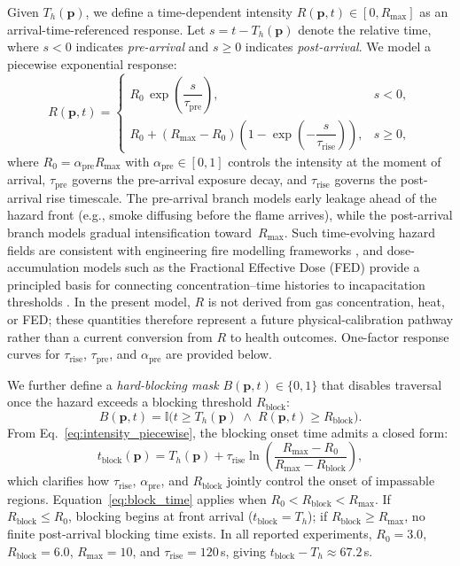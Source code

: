 \documentclass[preprint,12pt]{elsarticle}
\begin{document}
Given $T_h(\mathbf{p})$, we define a time-dependent intensity
$R(\mathbf{p}, t) \in [0, R_{\max}]$ as an arrival-time-referenced response.
Let $s = t - T_h(\mathbf{p})$ denote the relative time, where $s < 0$ indicates
\emph{pre-arrival} and $s \geq 0$ indicates \emph{post-arrival}. We model a
piecewise exponential response:
\begin{equation}
R(\mathbf{p}, t) =
\begin{cases}
R_0 \,\exp\!\left(\dfrac{s}{\tau_{\mathrm{pre}}}\right),
& s < 0, \\[8pt]
R_0 + (R_{\max} - R_0)\!\left(1 - \exp\!\left(-\dfrac{s}{\tau_{\mathrm{rise}}}\right)\right),
& s \geq 0,
\end{cases}
\label{eq:intensity_piecewise}
\end{equation}
where $R_0 = \alpha_{\mathrm{pre}} R_{\max}$ with $\alpha_{\mathrm{pre}} \in [0,1]$
controls the intensity at the moment of arrival, $\tau_{\mathrm{pre}}$ governs the
pre-arrival exposure decay, and $\tau_{\mathrm{rise}}$ governs the post-arrival
rise timescale. The pre-arrival branch models early leakage ahead of the hazard
front (e.g., smoke diffusing before the flame arrives), while the post-arrival
branch models gradual intensification toward~$R_{\max}$.
Such time-evolving hazard fields are consistent with engineering fire modelling
frameworks \citep{McGrattan2013FDS}, and dose-accumulation models such as the
Fractional Effective Dose (FED) provide a principled basis for connecting
concentration--time histories to incapacitation thresholds \citep{Purser1989FED}.
In the present model, $R$ is not derived from gas concentration, heat, or
FED; these quantities therefore represent a future physical-calibration
pathway rather than a current conversion from $R$ to health outcomes.
One-factor response curves for $\tau_{\mathrm{rise}}$,
$\tau_{\mathrm{pre}}$, and $\alpha_{\mathrm{pre}}$ are provided below.

We further define a \emph{hard-blocking mask} $B(\mathbf{p}, t) \in \{0, 1\}$
that disables traversal once the hazard exceeds a blocking threshold
$R_{\mathrm{block}}$:
\begin{equation}
B(\mathbf{p}, t)
= \mathbb{I}\!\Big(
t \geq T_h(\mathbf{p}) \;\wedge\; R(\mathbf{p}, t) \geq R_{\mathrm{block}}
\Big).
\label{eq:blocking}
\end{equation}
From Eq.~\eqref{eq:intensity_piecewise}, the blocking onset time admits a closed
form:
\begin{equation}
t_{\mathrm{block}}(\mathbf{p})
= T_h(\mathbf{p}) + \tau_{\mathrm{rise}} \ln\!\left(
\frac{R_{\max} - R_0}{R_{\max} - R_{\mathrm{block}}}
\right),
\label{eq:block_time}
\end{equation}
which clarifies how $\tau_{\mathrm{rise}}$, $\alpha_{\mathrm{pre}}$, and
$R_{\mathrm{block}}$ jointly control the onset of impassable regions.
Equation~\eqref{eq:block_time} applies when
$R_0<R_{\mathrm{block}}<R_{\max}$. If
$R_{\mathrm{block}}\le R_0$, blocking begins at front arrival
($t_{\mathrm{block}}=T_h$); if
$R_{\mathrm{block}}\ge R_{\max}$, no finite post-arrival blocking time
exists. In all reported experiments, $R_0=3.0$,
$R_{\mathrm{block}}=6.0$, $R_{\max}=10$, and
$\tau_{\mathrm{rise}}=120$\,s, giving
$t_{\mathrm{block}}-T_h\approx67.2$\,s.
\end{document}
